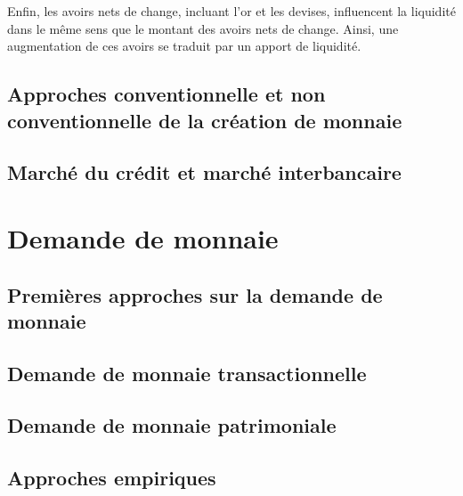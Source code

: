 \documentclass[a4paper, 12pt]{report}
\begin{document}
Enfin, les avoirs nets de change, incluant l'or et les devises, influencent la liquidité dans le même sens que le montant des avoirs nets de change. Ainsi, une augmentation de ces avoirs se traduit par un apport de liquidité.


\subsection{Approches conventionnelle et non conventionnelle de la création de monnaie}
	
\subsection{Marché du crédit et marché interbancaire}
	
\section{Demande de monnaie}	
	
\subsection{Premières approches sur la demande de monnaie}
	
\subsection{Demande de monnaie transactionnelle}
	
\subsection{Demande de monnaie patrimoniale}
	
\subsection{Approches empiriques}
	
	
	
	
	
\end{document}
